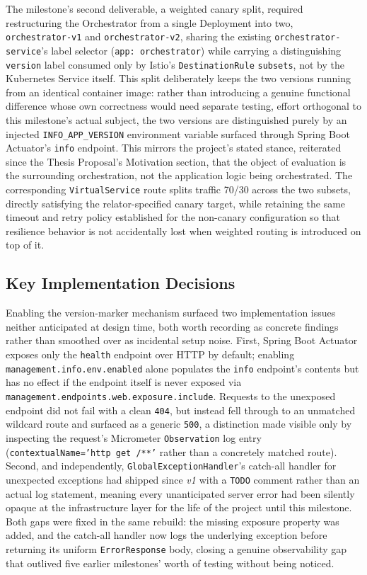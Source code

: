 \documentclass[twoside]{supsistudent}
\begin{document}
The milestone's second deliverable, a weighted canary split, required restructuring the Orchestrator from a single Deployment into two, \texttt{orchestrator-v1} and \texttt{orchestrator-v2}, sharing the existing \texttt{orchestrator-service}'s label selector (\texttt{app: orchestrator}) while carrying a distinguishing \texttt{version} label consumed only by Istio's \texttt{DestinationRule} \texttt{subsets}, not by the Kubernetes Service itself. This split deliberately keeps the two versions running from an identical container image: rather than introducing a genuine functional difference whose own correctness would need separate testing, effort orthogonal to this milestone's actual subject, the two versions are distinguished purely by an injected \texttt{INFO\_APP\_VERSION} environment variable surfaced through Spring Boot Actuator's \texttt{info} endpoint. This mirrors the project's stated stance, reiterated since the Thesis Proposal's Motivation section, that the object of evaluation is the surrounding orchestration, not the application logic being orchestrated. The corresponding \texttt{VirtualService} route splits traffic 70/30 across the two subsets, directly satisfying the relator-specified canary target, while retaining the same timeout and retry policy established for the non-canary configuration so that resilience behavior is not accidentally lost when weighted routing is introduced on top of it.

\subsection{Key Implementation Decisions}
Enabling the version-marker mechanism surfaced two implementation issues neither anticipated at design time, both worth recording as concrete findings rather than smoothed over as incidental setup noise. First, Spring Boot Actuator exposes only the \texttt{health} endpoint over HTTP by default; enabling \texttt{management.info.env.enabled} alone populates the \texttt{info} endpoint's contents but has no effect if the endpoint itself is never exposed via \\ \texttt{management.endpoints.web.exposure.include}. Requests to the unexposed endpoint did not fail with a clean \texttt{404}, but instead fell through to an unmatched wildcard route and surfaced as a generic \texttt{500}, a distinction made visible only by inspecting the request's Micrometer \texttt{Observation} log entry (\texttt{contextualName='http get /**'} rather than a concretely matched route). Second, and independently, \texttt{GlobalExceptionHandler}'s catch-all handler for unexpected exceptions had shipped since \emph{v1} with a \texttt{TODO} comment rather than an actual log statement, meaning every unanticipated server error had been silently opaque at the infrastructure layer for the life of the project until this milestone. Both gaps were fixed in the same rebuild: the missing exposure property was added, and the catch-all handler now logs the underlying exception before returning its uniform \texttt{ErrorResponse} body, closing a genuine observability gap that outlived five earlier milestones' worth of testing without being noticed.
\end{document}
